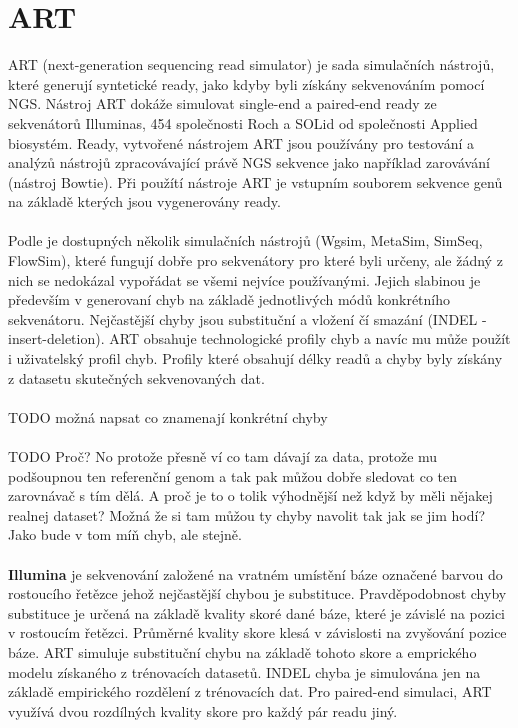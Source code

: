 \documentclass[czech,DP]{thesiskiv}
\numberwithin{equation}{section}
\begin{document}
\section{ART}
ART (next-generation sequencing read simulator) je sada simulačních nástrojů, které generují syntetické ready, jako kdyby byli získány sekvenováním pomocí NGS. Nástroj ART dokáže simulovat single-end a paired-end ready ze sekvenátorů Illuminas, 454 společnosti Roch a SOLid od společnosti Applied biosystém. Ready, vytvořené nástrojem ART jsou používány pro testování a analýzů nástrojů zpracovávající právě NGS sekvence jako například zarovávání (nástroj Bowtie). Při použítí nástroje ART je vstupním souborem sekvence genů na základě kterých jsou vygenerovány ready. \cite{art}
\\
\\
Podle \cite{art} je dostupných několik simulačních nástrojů (Wgsim, MetaSim, SimSeq, FlowSim), které fungují dobře pro sekvenátory pro které byli určeny, ale žádný z nich se nedokázal vypořádat se všemi nejvíce používanými. Jejich slabinou je především v generovaní chyb na základě jednotlivých módů konkrétního sekvenátoru. Nejčastější chyby jsou substituční a vložení čí smazání (INDEL - insert-deletion). ART obsahuje technologické profily chyb a navíc mu může použít i uživatelský profil chyb. Profily které obsahují délky readů a chyby byly získány z datasetu skutečných sekvenovaných dat. 
\\
\\
TODO možná napsat co znamenají konkrétní chyby
\\
\\
TODO
Proč? No protože přesně ví co tam dávají za data, protože mu podšoupnou ten referenční genom a tak pak můžou dobře sledovat co ten zarovnávač s tím dělá. 
A proč je to o tolik výhodnější než když by měli nějakej realnej dataset? 
Možná že si tam můžou ty chyby navolit tak jak se jim hodí?
Jako bude v tom míň chyb, ale stejně. 
\\
\\
\textbf{Illumina} je sekvenování založené na vratném umístění báze označené barvou do rostoucího řetězce jehož nejčastější chybou je substituce. Pravděpodobnost chyby substituce je určená na základě kvality skoré dané báze, které je závislé na pozici v rostoucím řetězci. Průměrné kvality skore klesá v závislosti na zvyšování pozice báze. ART simuluje substituční chybu na základě tohoto skore a emprického modelu získaného z trénovacích datasetů. INDEL chyba je simulována jen na základě empirického rozdělení z trénovacích dat. Pro paired-end simulaci, ART využívá dvou rozdílných kvality skore pro každý pár readu jiný. 
\end{document}
